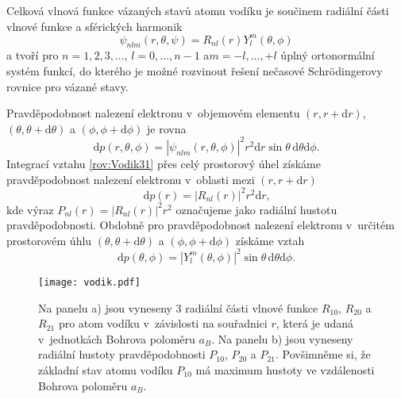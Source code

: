 Celková vlnová funkce vázaných stavů atomu vodíku je součinem radiální části vlnové funkce a sférických harmonik
\begin{equation}
\psi_{nlm}(r,\theta,\psi) = R_{nl}(r)Y_l^m(\theta, \phi)
\label{rov:Vodik30}
\end{equation}
a tvoří pro $n=1,2,3, \dots$, $l=0,\dots,n-1$ a$m=-l,\dots,+l$ úplný ortonormální systém funkcí, do kterého je možné rozvinout řešení nečasové Schrödingerovy rovnice pro vázané stavy.

Pravděpodobnost nalezení elektronu v~objemovém elementu $(r, r+ \mathrm{d}r)$, $(\theta,\theta+\mathrm{d}\theta)$ a $(\phi, \phi + \mathrm{d}\phi)$ je rovna
\begin{equation}
\mathrm{d}p (r, \theta, \phi) = |\psi_{nlm}(r, \theta, \phi)|^2 r^2 \mathrm{d}r \sin \theta \,\mathrm{d}\theta \mathrm{d}\phi \mbox{.}
\label{rov:Vodik31}
\end{equation} 
Integrací vztahu \eqref{rov:Vodik31} přes celý prostorový úhel získáme pravděpodobnost nalezení elektronu v~oblasti mezi $(r, r+ \mathrm{d}r)$
\begin{equation}
\mathrm{d}p (r) = |R_{nl}(r)|^2 r^2 \mathrm{d}r \mbox{,}
\label{rov:Vodik32}
\end{equation}
kde výraz $P_{nl}(r)=|R_{nl}(r)|^2 r^2$ označujeme jako radiální hustotu pravděpodobnosti. Obdobně pro pravděpodobnost nalezení elektronu v~určitém prostorovém úhlu $(\theta,\theta+\mathrm{d}\theta)$ a $(\phi, \phi + \mathrm{d}\phi)$ získáme vztah
\begin{equation}
\mathrm{d}p (\theta, \phi) = |Y_{l}^m(\theta, \phi)|^2 \sin \theta \,\mathrm{d}\theta \mathrm{d}\phi \mbox{.}
\end{equation}
\begin{figure} [!ht]
\centering
\texttt{[image: vodik.pdf]}
\caption[Radiální část vlnové funkce]{Na panelu a) jsou vyneseny 3 radiální části vlnové funkce $R_{10}$, $R_{20}$ a $R_{21}$ pro atom vodíku v~závislosti na souřadnici $r$, která je udaná v~jednotkách Bohrova poloměru $a_B$. Na panelu b) jsou vyneseny radiální hustoty pravděpodobnosti $P_{10}$, $P_{20}$ a $P_{21}$. Povšimněme si, že základní stav atomu vodíku $P_{10}$ má maximum hustoty ve vzdálenosti Bohrova poloměru $a_B$.}
\label{obr:RadialniFunkceVodik}
\end{figure}